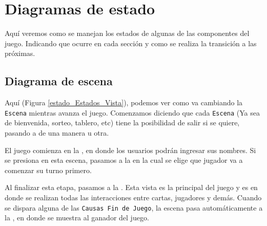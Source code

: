 	\section{Diagramas de estado}
	
	Aquí veremos como se manejan los estados de algunas de las componentes del juego. Indicando que ocurre en cada sección y como se realiza la transición a las próximas.
	
	\subsection{Diagrama de escena}
	
	Aquí (Figura \ref{estado_Estados_Vista}), podemos ver como va cambiando la \texttt{Escena} mientras avanza el juego. Comenzamos diciendo que cada \texttt{Escena} (Ya sea de bienvenida, sorteo, tablero, etc) tiene la posibilidad de salir si se quiere, pasando a  de una manera u otra.
	
	El juego comienza en la , en donde los usuarios podrán ingresar sus nombres. Si se presiona  en esta escena, pasamos a la  en la cual se elige que jugador va a comenzar su turno primero.
	
	Al finalizar esta etapa, pasamos a la . Esta vista es la principal del juego y es en donde se realizan todas las interacciones entre cartas, jugadores y demás. Cuando se dispara alguna de las \texttt{Causas Fin de Juego}, la escena pasa automáticamente a la , en donde se muestra al ganador del juego.
	
